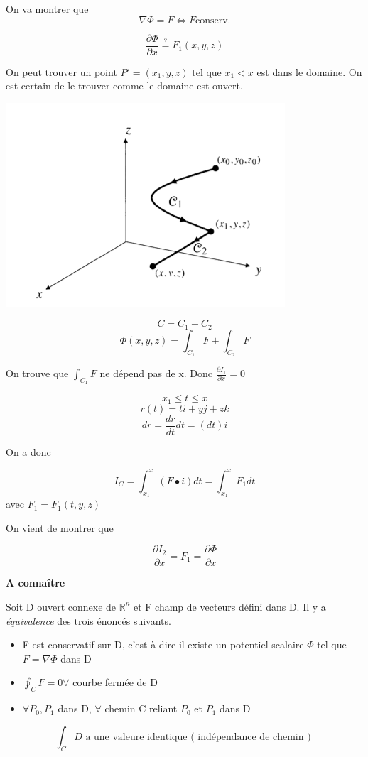 On va montrer que \[\nabla \Phi = F \Longleftrightarrow F \text{conserv.} \]

\[\frac{\partial \Phi}{\partial x} \overset{?}{=} F_1 (x,y,z) \]

On peut trouver un point $P' = ( x_1,y,z)$ tel que $x_1 < x$ est dans le domaine. On est certain de le trouver comme le domaine est ouvert.

\includegraphics[scale=0.7]{image4.png}

\[C=C_1+C_2\]
\[\Phi (x,y,z) = \int_{C_1} F + \int_{C_2} F\]

On trouve que $\int_{C_1} F$ ne dépend pas de x. Donc $\frac{\partial I_1}{\partial x }=0$

\[x_1\leqslant t \leqslant x \]
\[r(t) = t i +yj + zk \]
\[dr = \frac{dr}{dt}dt = (dt)i\]

On a donc

\[I_C = \int_{x_1}^x (F\bullet i)dt = \int_{x_1}^x F_1 dt\] avec $F_1 = F_1 ( t,y,z )$

On vient de montrer que

\[\frac{\partial I_2	}{\partial x} = F_1 = \frac{\partial \Phi}{\partial x}\]


\begin{mytheo}

\textbf{A connaître}

Soit D ouvert connexe de $\mathbb{R}^n$ et F champ de vecteurs défini dans D. Il y a \emph{équivalence } des trois énoncés suivants.

\begin{itemize}
\item F est conservatif sur D, c'est-à-dire il existe un potentiel scalaire $\Phi$ tel que $F=\nabla \Phi $ dans D
\item $\oint_C F =0 \forall $ courbe fermée de D
\item $\forall P_0,P_1$ dans D, $\forall$ chemin C reliant $P_0$ et $P_1$ dans D
\end{itemize}
\[\int_C D \text{ a une valeure identique ( indépendance de chemin ) }\]

\end{mytheo}

